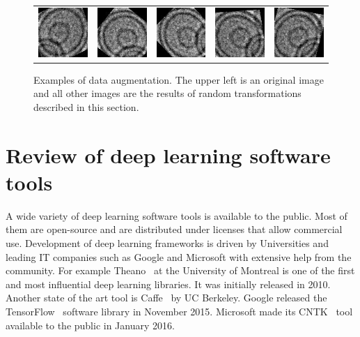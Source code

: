 \documentclass[a4paper, 11pt, table]{article}
\begin{document}
\begin{figure}[H]
\begin{tabular}{ccccc}
\includegraphics[scale=0.5]{augmented/_0_7140.jpeg} & \includegraphics[scale=0.5]{augmented/_0_7746.jpeg} & \includegraphics[scale=0.5]{augmented/_0_8553.jpeg} & \includegraphics[scale=0.5]{augmented/_0_8763.jpeg} & \includegraphics[scale=0.5]{augmented/_0_9361.jpeg} 
	
\end{tabular}
\caption{Examples of data augmentation. The upper left is an original image and all other images are the results of random transformations described in this section.}
\label{fig:augmented_images}
\end{figure}

\section{Review of deep learning software tools}

A wide variety of deep learning software tools is available to the public. Most of them are open-source and are distributed under licenses that allow commercial use. Development of deep learning frameworks is driven by Universities and leading IT companies such as Google and Microsoft with extensive help from the community. For example Theano~\cite{2016arXiv160502688short} at the University of Montreal is one of the first and most influential deep learning libraries. It was initially released in 2010. Another state of the art tool is Caffe~\cite{jia2014caffe} by UC Berkeley. Google released the TensorFlow~\cite{tensorflow2015-whitepaper} software library in November 2015. Microsoft made its CNTK~\cite{cntk} tool available to the public in January 2016.
\end{document}
